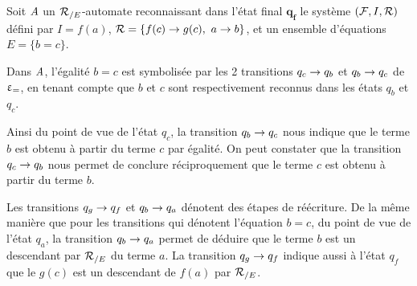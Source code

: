 \begin{example}
  \label{ex:semantics}
  Soit $\mathit A$ un ${\mathcal R_{/E}}$-automate reconnaissant dans l'état final
  $\mathbf{q_f}$ le système $(\mathcal{F}, I, \mathcal R)$ défini par $I = f(a)$, $\mathcal R =
  \{f(c) \rightarrow g(c),\ a \rightarrow b\}$, et un ensemble d'équations $E = \{ b =
  c\}$.

  Dans $\mathit A$, l'égalité $b = c$ est symbolisée par les 2 transitions $q_c
  \rightarrow q_b$ et $q_b \rightarrow q_c$ de $\upvarepsilon_{=}$, en tenant compte que $b$ et $c$
  sont respectivement reconnus dans les états $q_b$ et $q_c$.

  Ainsi du point de vue de l'état $q_c$, la transition $q_b \rightarrow q_c$
  nous indique que le terme $b$ est obtenu à partir du terme $c$ par égalité.
  On peut constater que la transition $q_c \rightarrow q_b$ nous permet 
  de conclure réciproquement que le terme $c$ est obtenu à partir du terme $b$.

  Les transitions $q_g \rightarrow q_f$ et $q_b \rightarrow q_a$ dénotent des étapes de réécriture.
  De la même manière que pour les transitions qui dénotent l'équation $b=c$, du point
  de vue de l'état $q_a$, la transition $q_b \rightarrow q_a$ permet de déduire que le terme
  $b$ est un descendant par ${\mathcal R_{/E}}$ du terme $a$. La transition $q_g \rightarrow q_f$ indique 
  aussi à l'état $q_f$ que le $g(c)$ est un descendant de $f(a)$ par ${\mathcal R_{/E}}$.


\end{example}
